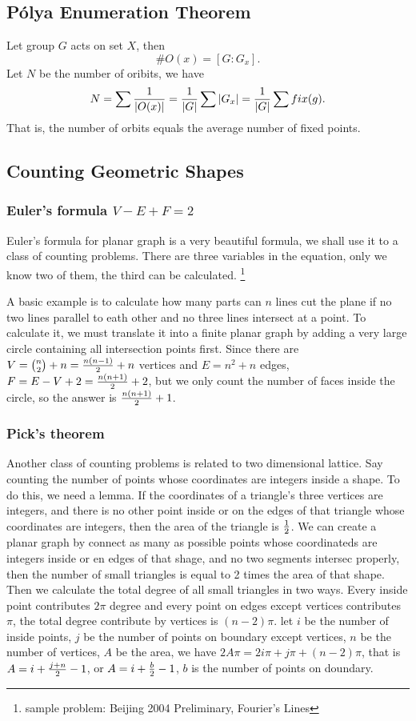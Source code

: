 \subsection{P\'olya Enumeration Theorem}
Let group $G$ acts on set $X$, then $$\#O(x)=[G:G_x].$$
Let $N$ be the number of oribits, we have 
$$N=\sum{1\over \left| O(x)\right|}
={1\over{\left| G\right|}}\sum{\left| G_x\right|}
={1\over{\left| G\right|}}\sum fix(g).$$
That is, the number of orbits equals the average number of fixed points.

\subsection{Counting Geometric Shapes}
\subsubsection{Euler's formula $V-E+F=2$}
Euler's formula for planar graph is a very beautiful formula,
we shall use it to a class of counting problems.
There are three variables in the equation, only we know two of them, the third can be calculated.
\footnote{sample problem: Beijing 2004 Preliminary, Fourier's Lines}

A basic example is to calculate how many parts can $n$ lines cut the plane if no two lines parallel
to eath other and no three lines intersect at a point. To calculate it, we must translate it into a
finite planar graph by adding a very large circle containing all intersection points first.
Since there are $V={n\choose 2}+n={n(n-1)\over 2} + n$ vertices
and $E=n^{2} + n$ edges, $F=E-V+2={n(n+1)\over 2} + 2$, but we only count the number of faces inside the
circle, so the answer is ${n(n+1)\over 2} + 1$.

\subsubsection{Pick's theorem}
Another class of counting problems is related to two dimensional lattice.
Say counting the number of points whose coordinates are integers inside a shape.
To do this, we need a lemma. If the coordinates of a triangle's three vertices are integers,
and there is no other point inside or on the edges of that triangle whose coordinates are integers,
then the area of the triangle is ${1\over 2}$. We can create a planar graph by connect as many as possible
points whose coordinateds are integers inside or en edges of that shage,
and no two segments intersec properly, then the number of small triangles is equal to 2 times the area of that shape.
Then we calculate the total degree of all small triangles in two ways.
Every inside point contributes $2\pi$ degree and every point on edges except vertices contributes $\pi$,
the total degree contribute by vertices is $(n-2)\pi$.
let $i$ be the number of inside points,
$j$ be the number of points on boundary except vertices,
$n$ be the number of vertices,
$A$ be the area, we have $2A\pi = 2i\pi + j\pi + (n-2)\pi$,
that is $A=i+{j+n\over 2}-1$, or $A=i+{b\over 2}-1$,
$b$ is the number of points on doundary.

